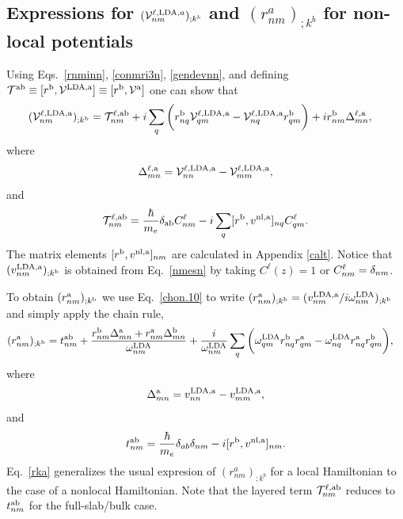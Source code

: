 \documentclass[floatfix,prb,aps,superscriptaddress,11pt,preprint,letterpaper]{revtex4}
\def\chon{black}
\begin{document}
\subsection{Expressions for 
\texorpdfstring{$({\mathbf{\cal V}}^{\ell,\mathrm{LDA},a}_{nm})_{;k^b}$}{Vnonlocal}
and \texorpdfstring{$(r^a_{nm})_{;k^b}$}{Vnonlocal}
for non-local potentials}\label{appvnl}

Using Eqs.~\eqref{rnminn}, \eqref{conmri3n}, \eqref{gendevnn}, and
defining 
$
{\cal T}^{\mathrm{a}\mathrm{b}}\equiv[r^{\mathrm{b}},{\mathbf{\cal V}}^{\mathrm{LDA},\mathrm{a}}]
\equiv
[r^{\mathrm{b}},{\mathbf{\cal V}}^{\mathrm{a}}]
$
one can show that{\color{\chon} 
\begin{align}\label{nmesn}
({\mathbf{\cal V}}^{\ell,\mathrm{LDA},\mathrm{a}}_{nm})_{;k^{\mathrm{b}}}&=
{\cal T}_{nm}^{\ell,\mathrm{a}\mathrm{b}}
+i
\sum_{q}
\bigg(
r^{\mathrm{b}}_{nq}  
{\mathbf{\cal V}}^{\ell,\mathrm{LDA},\mathrm{a}}_{q m}
-
{\mathbf{\cal V}}^{\ell,\mathrm{LDA},\mathrm{a}}_{nq}   
r^{\mathrm{b}}_{q m}
\bigg)  
+i  
r^{\mathrm{b}}_{nm}
\Delta^{\ell,\mathrm{a}}_{mn}
,
\end{align}}
where
\begin{eqnarray}\label{tdel}
\Delta^{\ell,\mathrm{a}}_{mn}
=
{\mathbf{\cal V}}^{\ell,\mathrm{LDA},\mathrm{a}}_{nn}  
-
{\mathbf{\cal V}}^{\ell,\mathrm{LDA},\mathrm{a}}_{mm}  
,
\end{eqnarray} 
and
\begin{align}\label{tau.1}
{\cal T}_{nm}^{\ell,\mathrm{a}\mathrm{b}}
=
\frac{\hbar}{m_e}\delta_{\mathrm{a}\mathrm{b}}
C^\ell_{nm} 
-i 
\sum_q 
[r^{\mathrm{b}},v^{\mathrm{nl},\mathrm{a}}]_{nq}C^\ell_{qm} 
.
\end{align}  
The matrix elements $[r^{\mathrm{b}},v^{\mathrm{nl},\mathrm{a}}]_{nm}$
are calculated in Appendix \ref{calt}.
Notice that
{\color{\chon} 
$(v^{\mathrm{LDA},\mathrm{a}}_{nm})_{;k^{\mathrm{b}}}$} is obtained 
from Eq.~\eqref{nmesn} by 
taking 
{\color{\chon} $C^\ell(z)=1$ or $C^\ell_{nm}=\delta_{nm}$.}

To obtain $(r^{\mathrm{a}}_{nm})_{;k^{\mathrm{b}}}$ we use Eq.~\eqref{chon.10} to
write
$(r^{\mathrm{a}}_{nm})_{;k^{\mathrm{b}}}
=(v^{\mathrm{LDA},\mathrm{a}}_{nm}/i\omega^{\mathrm{LDA}}_{nm})_{;k^{\mathrm{b}}}
$ {\color{\chon} and} simply apply the chain rule,
\begin{align}\label{rka}
(r^{\mathrm{a}}_{nm})_{;k^{\mathrm{b}}}
&=
t^{\mathrm{a}\mathrm{b}}_{nm}
+
\frac{ 
r^{\mathrm{b}}_{nm}
\Delta^{\mathrm{a}}_{mn}
+r^{\mathrm{a}}_{nm}
\Delta^{\mathrm{b}}_{mn}
}
{\omega^{\mathrm{LDA}}_{nm}}
+
\frac{i}{\omega^{\mathrm{LDA}}_{nm}}
\sum_{q}
\bigg(
\omega^{\mathrm{LDA}}_{q m} 
r^{\mathrm{b}}_{nq} 
r^{\mathrm{a}}_{q m}
-
\omega^{\mathrm{LDA}}_{nq} 
r^{\mathrm{a}}_{nq} 
r^{\mathrm{b}}_{q m}
\bigg)
,
\end{align} 
where 
\begin{eqnarray}\label{del}
\Delta^{\mathrm{a}}_{mn}
=
v^{\mathrm{LDA},\mathrm{a}}_{nn}  
-
v^{\mathrm{LDA},\mathrm{a}}_{mm}  
,
\end{eqnarray}
and{\color{\chon} 
\begin{align}\label{tau.1n} 
t_{nm}^{\mathrm{a}\mathrm{b}}
=\frac{\hbar}{m_e}\delta_{ab}\delta_{nm} 
-i [r^{\mathrm{b}},v^{\mathrm{nl},\mathrm{a}}]_{nm} 
.
\end{align}}
Eq.~\eqref{rka} generalizes the usual expresion of
$(r^a_{nm})_{;k^b}$ for {\color{\chon} a} local 
{\color{\chon} Hamiltonian}
\cite{aversaPRB95,nastosPRB05,cabellosPRB09,rashkeevPRB98}
to
the case of a
nonlocal Hamiltonian.
Note that the layered term
${\cal T}^{\ell,\mathrm{a}\mathrm{b}}_{nm}$ reduces to $t^{\mathrm{a}\mathrm{b}}_{nm}$
{\color{\chon} for the full-slab/bulk case.}
\end{document}
